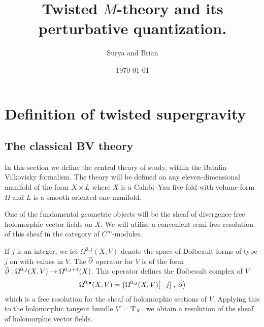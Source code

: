 \documentclass[11pt]{amsart}
\author{Surya and Brian}
\date{\today}
\title{Twisted \(M\)-theory and its perturbative quantization.}
\def\T{{\rm T}}
\begin{document}
\maketitle
\tableofcontents


\section{Definition of twisted supergravity}

\label{sec:org24653eb}
\subsection{The classical BV theory}
\label{sec:org5c9d94b}
In this section we define the central theory of study, within the Batalin--Vilkovisky formalism.
The theory will be defined on any eleven-dimensional manifold of the form $X \times L$ where $X$ is a Calabi--Yau five-fold with volume form $\Omega$ and $L$ is a smooth oriented one-manifold.

One of the fundamental geometric objects will be the sheaf of divergence-free holomorphic vector fields on $X$. 
We will utilize a convenient semi-free resolution of this sheaf in the category of $C^\infty$-modules. 

If $j$ is an integer, we let $\Omega^{0,j}(X, V)$ denote the space of Dolbeault forms of type $j$ on with values in $V$.
The $\overline{\partial}$ operator for $V$ is of the form $\overline{\partial} : \Omega^{0,j}(X, V)\to \Omega^{0,j+1}(X)$.
This operator defines the Dolbeault complex of $V$
\[
  \Omega^{0,\bullet}(X, V) = \left(\Omega^{0,j}(X, V)[-j] \; , \; \overline{\partial}\right)
\]
which is a free resolution for the sheaf of holomorphic sections of $V$.
Applying this to the holomorphic tangent bundle $V = \T_X$, we obtain a resolution of the sheaf of holomorphic vector fields. 

%
\end{document}
